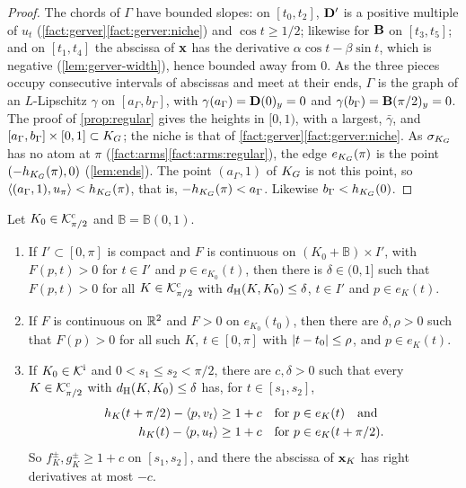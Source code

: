 \begin{proof}
The chords of $\Gamma$ have bounded slopes: on $[t_0,t_2]$, $\mathbf{D}'$ is a
positive multiple of $u_t$ (\cref{fact:gerver}\ref{fact:gerver:niche}) and
$\cos t\ge1/2$; likewise for $\mathbf{B}$ on $[t_3,t_5]$; and on $[t_1,t_4]$ the
abscissa of $\mathbf{x}$ has the derivative $\alpha\cos t-\beta\sin t$, which is
negative (\cref{lem:gerver-width}), hence bounded away from $0$. As the three
pieces occupy consecutive intervals of abscissas and meet at their ends,
$\Gamma$ is the graph of an $L$-Lipschitz $\gamma$ on $[a_\Gamma,b_\Gamma]$,
with $\gamma(a_\Gamma)=\mathbf{D}(0)_y=0$ and $\gamma(b_\Gamma)=\mathbf{B}(\pi/2)_y=0$. The
proof of \cref{prop:regular} gives the heights in $[0,1)$, with a largest,
$\bar\gamma$, and $[a_\Gamma,b_\Gamma]\times[0,1]\subset K_G$; the niche is that
of \cref{fact:gerver}\ref{fact:gerver:niche}. As $\sigma_{K_G}$ has no atom at
$\pi$ (\cref{fact:arms}\ref{fact:arms:regular}), the edge $e_{K_G}(\pi)$ is the
point $(-h_{K_G}(\pi),0)$ (\cref{lem:ends}). The point $(a_\Gamma,1)$ of $K_G$
is not this point, so $\langle (a_\Gamma,1),u_\pi\rangle<h_{K_G}(\pi)$, that is,
$-h_{K_G}(\pi)<a_\Gamma$. Likewise $b_\Gamma<h_{K_G}(0)$.
\end{proof}

\begin{lemma}\label{lem:stab-faces}
Let $K_0\in\mathcal{K}^{\mathrm{c}}_{\pi/2}$ and $\mathbb B=\mathbb B(0,1)$.
\begin{enumerate}[label=(\alph*)]
\item\label{lem:stab-faces:fixed} If $I'\subset[0,\pi]$ is compact and $F$ is
continuous on $(K_0+\mathbb B)\times I'$, with $F(p,t)>0$ for $t\in I'$ and
$p\in e_{K_0}(t)$, then there is $\delta\in(0,1]$ such that $F(p,t)>0$ for all
$K\in\mathcal{K}^{\mathrm{c}}_{\pi/2}$ with $d_{\mathrm{H}}(K,K_0)\le\delta$, $t\in I'$ and $p\in e_K(t)$.
\item\label{lem:stab-faces:angle} If $F$ is continuous on $\mathbb{R}^2$ and $F>0$ on
$e_{K_0}(t_0)$, then there are $\delta,\rho>0$ such that $F(p)>0$ for all such
$K$, $t\in[0,\pi]$ with $\lvert t-t_0\rvert\le\rho$, and $p\in e_K(t)$.
\item\label{lem:stab-faces:arms} If $K_0\in\mathcal{K}^{\mathrm{i}}$ and $0<s_1\le s_2<\pi/2$,
there are $c,\delta>0$ such that every $K\in\mathcal{K}^{\mathrm{c}}_{\pi/2}$ with
$d_{\mathrm{H}}(K,K_0)\le\delta$ has, for $t\in[s_1,s_2]$,
\begin{align*}
  h_K(t+\pi/2)-\langle p,v_t\rangle&\ge1+c\quad\text{for }p\in e_K(t)\quad\text{and}\\
  h_K(t)-\langle p,u_t\rangle&\ge1+c\quad\text{for }p\in e_K(t+\pi/2).
\end{align*}
So $f^\pm_K,g^\pm_K\ge1+c$ on $[s_1,s_2]$, and there the abscissa of $\mathbf{x}_K$
has right derivatives at most $-c$.
\end{enumerate}
\end{lemma}

